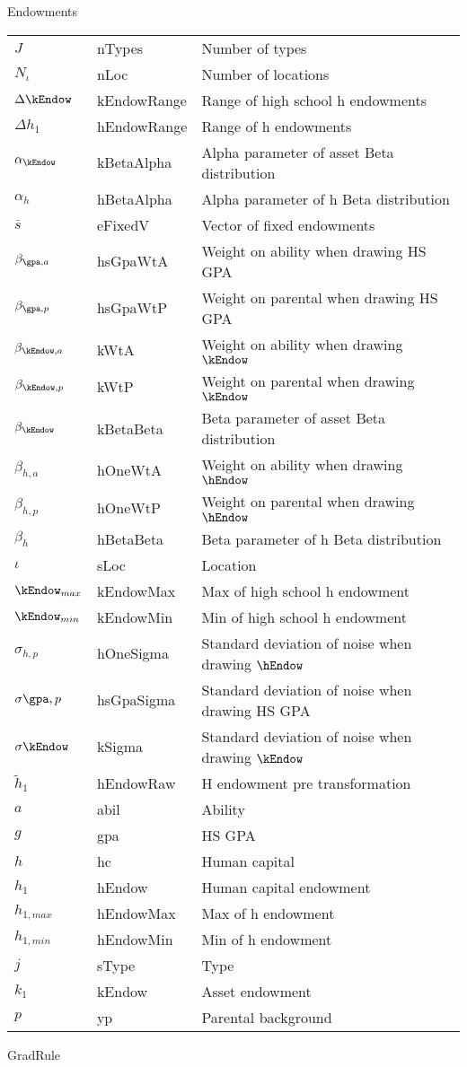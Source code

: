 Endowments

\begin{tabular}{lll}
\hline
$J$ & nTypes & Number of types\tabularnewline
$N_{\iota}$ & nLoc & Number of locations\tabularnewline
$\Delta \kEndow$ & kEndowRange & Range of high school h endowments\tabularnewline
$\Delta h_{1}$ & hEndowRange & Range of h endowments\tabularnewline
$\alpha_{\kEndow}$ & kBetaAlpha & Alpha parameter of asset Beta distribution\tabularnewline
$\alpha_{h}$ & hBetaAlpha & Alpha parameter of h Beta distribution\tabularnewline
$\bar{s}$ & eFixedV & Vector of fixed endowments\tabularnewline
$\beta_{\gpa,a}$ & hsGpaWtA & Weight on ability when drawing HS GPA\tabularnewline
$\beta_{\gpa,p}$ & hsGpaWtP & Weight on parental when drawing HS GPA\tabularnewline
$\beta_{\kEndow,a}$ & kWtA & Weight on ability when drawing $\kEndow$\tabularnewline
$\beta_{\kEndow,p}$ & kWtP & Weight on parental when drawing $\kEndow$\tabularnewline
$\beta_{\kEndow}$ & kBetaBeta & Beta parameter of asset Beta distribution\tabularnewline
$\beta_{h,a}$ & hOneWtA & Weight on ability when drawing $\hEndow$\tabularnewline
$\beta_{h,p}$ & hOneWtP & Weight on parental when drawing $\hEndow$\tabularnewline
$\beta_{h}$ & hBetaBeta & Beta parameter of h Beta distribution\tabularnewline
$\iota$ & sLoc & Location\tabularnewline
$\kEndow_{max}$ & kEndowMax & Max of high school h endowment\tabularnewline
$\kEndow_{min}$ & kEndowMin & Min of high school h endowment\tabularnewline
$\sigma_{h,p}$ & hOneSigma & Standard deviation of noise when drawing $\hEndow$\tabularnewline
$\sigma{\gpa,p}$ & hsGpaSigma & Standard deviation of noise when drawing HS GPA\tabularnewline
$\sigma{\kEndow}$ & kSigma & Standard deviation of noise when drawing $\kEndow$\tabularnewline
$\tilde{h}_1$ & hEndowRaw & H endowment pre transformation\tabularnewline
$a$ & abil & Ability\tabularnewline
$g$ & gpa & HS GPA\tabularnewline
$h$ & hc & Human capital\tabularnewline
$h_1$ & hEndow & Human capital endowment\tabularnewline
$h_{1,max}$ & hEndowMax & Max of h endowment\tabularnewline
$h_{1,min}$ & hEndowMin & Min of h endowment\tabularnewline
$j$ & sType & Type\tabularnewline
$k_{1}$ & kEndow & Asset endowment\tabularnewline
$p$ & yp & Parental background\tabularnewline
\hline
\end{tabular}
 
GradRule

